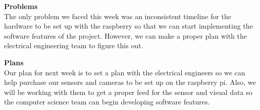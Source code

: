 \documentclass[onecolumn, oneside, letterpaper, draftclsnofoot, 10pt, compsoc]{IEEEtran}
\begin{document}
\noindent \textbf{Problems}\\
The only problem we faced this week was an inconsistent timeline for the hardware to be set up with the raspberry so that we can start implementing the software features of the project. However, we can make a proper plan with the electrical engineering team to figure this out.

\noindent \textbf{Plans}\\
 Our plan for next week is to set a plan with the electrical engineers so we can help purchase our sensors and cameras to be set up on the raspberry pi. Also, we will be working with them to get a proper feed for the sensor and visual data so the computer science team can begin developing software features.

\end{document}
